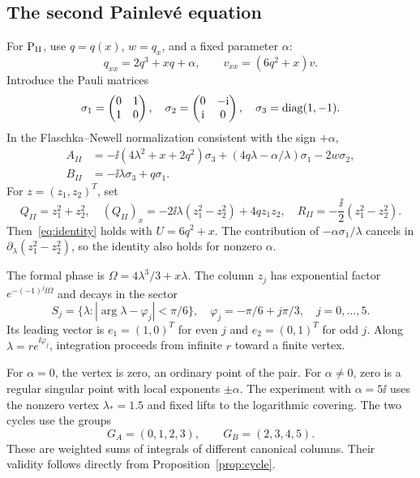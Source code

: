 \subsection{The second Painlev\'e equation}
For $\mathrm{P}_{\mathrm{II}}$, use $q=q(x)$, $w=q_x$, and a fixed parameter $\alpha$:
\begin{equation}\label{eq:pii}
 q_{xx}=2q^3+xq+\alpha,\qquad v_{xx}=(6q^2+x)v.
\end{equation}
Introduce the Pauli matrices
\[
 \sigma_1=\begin{pmatrix}0&1\\1&0\end{pmatrix},\quad
 \sigma_2=\begin{pmatrix}0&-\mathrm{i}\\\mathrm{i}&0\end{pmatrix},\quad
 \sigma_3=\operatorname{diag}(1,-1).
\]
In the Flaschka--Newell normalization consistent with the sign $+\alpha$,
\begin{equation*}
 \begin{split}
 A_{II}&=-\ii(4\lambda^2+x+2q^2)\sigma_3
 +(4q\lambda-\alpha/\lambda)\sigma_1-2w\sigma_2,\\
 B_{II}&=-\ii\lambda\sigma_3+q\sigma_1.
 \end{split}
\end{equation*}
For $z=(z_1,z_2)^T$, set
\begin{equation*}
 Q_{II}=z_1^2+z_2^2,\quad
 (Q_{II})_x=-2\ii\lambda(z_1^2-z_2^2)+4qz_1z_2,\quad
 R_{II}=-\frac{\ii}{2}(z_1^2-z_2^2).
\end{equation*}
Then~\eqref{eq:identity} holds with $U=6q^2+x$.
The contribution of $-\alpha\sigma_1/\lambda$ cancels in
$\partial_\lambda(z_1^2-z_2^2)$, so the identity also holds for
nonzero $\alpha$.

The formal phase is $\Omega=4\lambda^3/3+x\lambda$.
The column $z_j$ has exponential factor $e^{-(-1)^j\ii\Omega}$ and
decays in the sector
\begin{equation}\label{eq:pii-sectors}
 S_j=\{\lambda:|\arg\lambda-\varphi_j|<\pi/6\},\quad
 \varphi_j=-\pi/6+j\pi/3,\quad j=0,\ldots,5.
\end{equation}
Its leading vector is $e_1=(1,0)^T$ for even $j$ and $e_2=(0,1)^T$
for odd $j$. Along $\lambda=re^{\ii\varphi_j}$, integration proceeds
from infinite $r$ toward a finite vertex.

For $\alpha=0$, the vertex is zero, an ordinary point of the pair.
For $\alpha\ne0$, zero is a regular singular point with local exponents
$\pm\alpha$. The experiment with $\alpha=5\ii$ uses the nonzero vertex
$\lambda_*=1.5$ and fixed lifts to the logarithmic covering.
The two cycles use the groups
\begin{equation*}
 G_A=(0,1,2,3),\qquad G_B=(2,3,4,5).
\end{equation*}
These are weighted sums of integrals of different canonical columns.
Their validity follows directly from Proposition~\ref{prop:cycle}.

